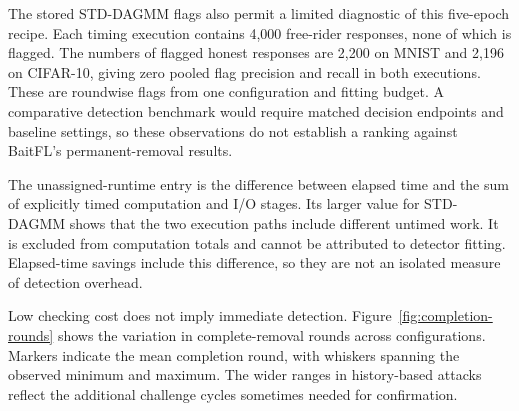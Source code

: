 \documentclass[journal]{IEEEtran}
\begin{document}
The stored STD-DAGMM flags also permit a limited diagnostic of this
five-epoch recipe. Each timing execution contains 4,000 free-rider
responses, none of which is flagged. The numbers of flagged honest
responses are 2,200 on MNIST and 2,196 on CIFAR-10, giving zero pooled
flag precision and recall in both executions. These are roundwise flags
from one configuration and fitting budget. A comparative detection
benchmark would require matched decision endpoints and baseline settings,
so these observations do not establish a ranking against BaitFL's
permanent-removal results.

The unassigned-runtime entry is the difference between elapsed time and
the sum of explicitly timed computation and I/O stages. Its larger value
for STD-DAGMM shows that the two execution paths include different
untimed work. It is excluded from computation totals and cannot be
attributed to detector fitting. Elapsed-time savings include this
difference, so they are not an isolated measure of detection overhead.

Low checking cost does not imply immediate detection.
Figure~\ref{fig:completion-rounds} shows the variation in complete-removal
rounds across configurations. Markers indicate the mean completion round,
with whiskers spanning the observed minimum and maximum.
The wider ranges in history-based attacks
reflect the additional challenge cycles sometimes needed for confirmation.
\end{document}
